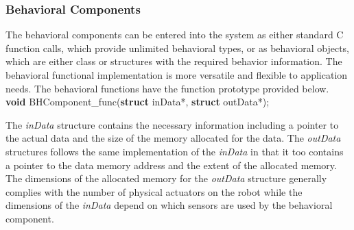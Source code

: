       \subsubsection{Behavioral Components}
        The behavioral components can be entered into the system as either 
          standard C function calls, which provide unlimited behavioral 
          types, or as behavioral objects, which are either class or structures 
          with the required behavior information.
        The behavioral functional implementation is more versatile and flexible 
          to application needs.
        The behavioral functions have the function prototype provided below.\\
        \indent
        {\footnotesize
          \textbf{void} BHComponent\_func(\textbf{struct} inData*, 
              \textbf{struct} outData*);
        }

        \noindent
        The \textit{inData} structure contains the necessary information 
          including a pointer to the actual data and the size of the memory
          allocated for the data.
        The \textit{outData} structures follows the same implementation of
          the \textit{inData} in that it too contains a pointer to the data
          memory address and the extent of the allocated memory.
        The dimensions of the allocated memory for the \textit{outData}
          structure generally complies with the number of physical actuators
          on the robot while the dimensions of the \textit{inData} depend
          on which sensors are used by the behavioral component.

